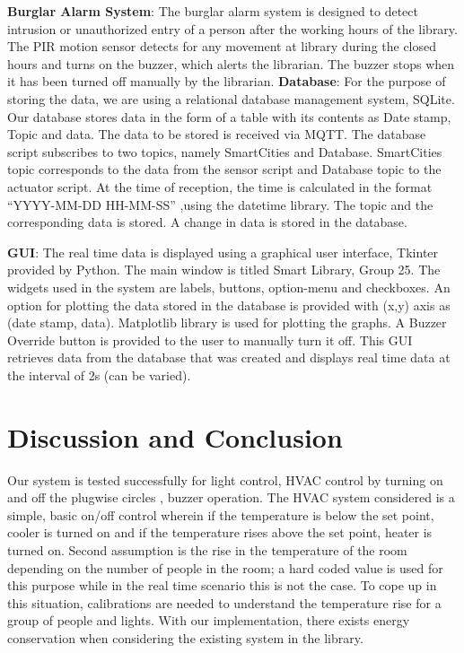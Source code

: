 \documentclass[runningheads]{llncs}
\begin{document}
\textbf{Burglar Alarm System}:
	The burglar alarm system is designed to detect intrusion or unauthorized entry of a person after the working hours of the library. The PIR motion sensor detects for any movement at library during the closed hours and turns on the buzzer, which alerts the librarian. The buzzer stops when it has been turned off manually by the librarian.
\vspace{2mm}
\newline\textbf{Database}:
	For the purpose of storing the data, we are using a relational database management system, SQLite. Our database stores data in the form of a table with its contents as Date stamp, Topic and data. The data to be stored is received via MQTT. The database script subscribes to two topics, namely SmartCities and Database. SmartCities topic corresponds to the data from the sensor script and Database topic to the actuator script. At the time of reception, the time is calculated in the format “YYYY-MM-DD HH-MM-SS” ,using the datetime library. The topic and the corresponding data is stored. A change in data is stored in the database.

\vspace{3mm}
\textbf{GUI}:
The real time data is displayed using a graphical user interface, Tkinter provided by Python. The main window is titled Smart Library, Group 25. The widgets used in the system are labels, buttons, option-menu and checkboxes. An option for plotting the data stored in the database is provided with (x,y) axis as (date stamp, data). Matplotlib library is used for plotting the graphs. A Buzzer Override button is provided to the user to manually turn it off. This GUI retrieves data from the database that was created and displays real time data at the interval of 2s (can be varied).


\section{Discussion and Conclusion}
Our system is tested successfully for light control, HVAC control by turning on and off the plugwise circles , buzzer operation. The HVAC system considered is a simple, basic on/off control wherein if the temperature is below the set point, cooler is turned on and if the temperature rises above the set point, heater is turned on. Second assumption is the rise in the temperature of the room depending on the number of people in the room; a hard coded value is used for this purpose while in the real time scenario this is not the case. To cope up in this situation, calibrations are needed to understand the temperature rise for a group of people and lights. With our implementation, there exists energy conservation when considering the existing system in the library.

%
%


\end{document}
